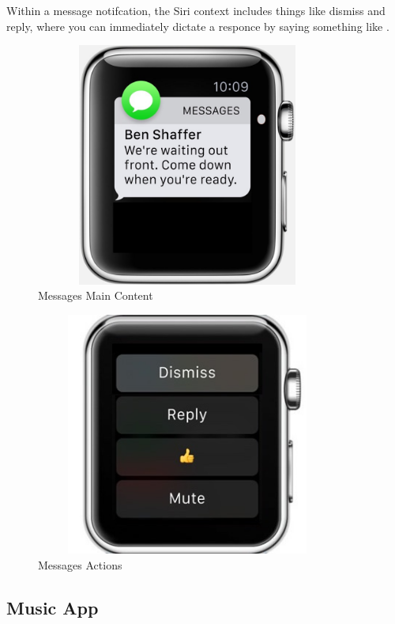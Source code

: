 \documentclass[journal,letterpaper]{article}
\begin{document}
    Within a message notifcation, the Siri context includes things like dismiss and reply, where you can immediately dictate a responce by saying something like .

    \begin{figure}[htbp]
        \centering
        \includegraphics[width=10cm,height=8cm,keepaspectratio]{messages}
        \caption{Messages Main Content}
        \label{fig:messages}
    \end{figure}

    \begin{figure}[htbp]
        \centering
        \includegraphics[width=10cm,height=8cm,keepaspectratio]{messages-actions}
        \caption{Messages Actions}
        \label{fig:messages_actions}
    \end{figure}

    \subsection{Music App}
\end{document}
